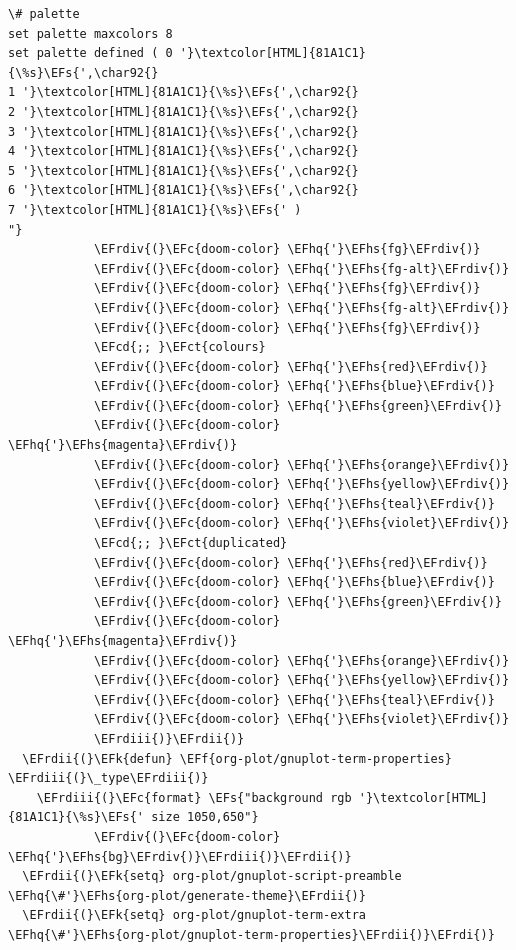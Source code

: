 \documentclass{scrartcl}
\newcommand{\EFk}[1]{\textcolor{EFk}{#1}} %
\newcommand{\EFs}[1]{\textcolor{EFs}{#1}} %
\newcommand{\EFct}[1]{\textcolor{EFct}{#1}} %
\newcommand{\EFc}[1]{\textcolor{EFc}{#1}} %
\newcommand{\EFf}[1]{\textcolor{EFf}{#1}} %
\newcommand{\EFcd}[1]{\textcolor{EFcd}{#1}} %
\newcommand{\EFhq}[1]{#1} %
\newcommand{\EFhs}[1]{#1} %
\newcommand{\EFrdi}[1]{#1} %
\newcommand{\EFrdii}[1]{#1} %
\newcommand{\EFrdiii}[1]{#1} %
\newcommand{\EFrdiv}[1]{#1} %
\begin{document}
\begin{Code}
\begin{Verbatim}[]
\# palette
set palette maxcolors 8
set palette defined ( 0 '}\textcolor[HTML]{81A1C1}{\%s}\EFs{',\char92{}
1 '}\textcolor[HTML]{81A1C1}{\%s}\EFs{',\char92{}
2 '}\textcolor[HTML]{81A1C1}{\%s}\EFs{',\char92{}
3 '}\textcolor[HTML]{81A1C1}{\%s}\EFs{',\char92{}
4 '}\textcolor[HTML]{81A1C1}{\%s}\EFs{',\char92{}
5 '}\textcolor[HTML]{81A1C1}{\%s}\EFs{',\char92{}
6 '}\textcolor[HTML]{81A1C1}{\%s}\EFs{',\char92{}
7 '}\textcolor[HTML]{81A1C1}{\%s}\EFs{' )
"}
            \EFrdiv{(}\EFc{doom-color} \EFhq{'}\EFhs{fg}\EFrdiv{)}
            \EFrdiv{(}\EFc{doom-color} \EFhq{'}\EFhs{fg-alt}\EFrdiv{)}
            \EFrdiv{(}\EFc{doom-color} \EFhq{'}\EFhs{fg}\EFrdiv{)}
            \EFrdiv{(}\EFc{doom-color} \EFhq{'}\EFhs{fg-alt}\EFrdiv{)}
            \EFrdiv{(}\EFc{doom-color} \EFhq{'}\EFhs{fg}\EFrdiv{)}
            \EFcd{;; }\EFct{colours}
            \EFrdiv{(}\EFc{doom-color} \EFhq{'}\EFhs{red}\EFrdiv{)}
            \EFrdiv{(}\EFc{doom-color} \EFhq{'}\EFhs{blue}\EFrdiv{)}
            \EFrdiv{(}\EFc{doom-color} \EFhq{'}\EFhs{green}\EFrdiv{)}
            \EFrdiv{(}\EFc{doom-color} \EFhq{'}\EFhs{magenta}\EFrdiv{)}
            \EFrdiv{(}\EFc{doom-color} \EFhq{'}\EFhs{orange}\EFrdiv{)}
            \EFrdiv{(}\EFc{doom-color} \EFhq{'}\EFhs{yellow}\EFrdiv{)}
            \EFrdiv{(}\EFc{doom-color} \EFhq{'}\EFhs{teal}\EFrdiv{)}
            \EFrdiv{(}\EFc{doom-color} \EFhq{'}\EFhs{violet}\EFrdiv{)}
            \EFcd{;; }\EFct{duplicated}
            \EFrdiv{(}\EFc{doom-color} \EFhq{'}\EFhs{red}\EFrdiv{)}
            \EFrdiv{(}\EFc{doom-color} \EFhq{'}\EFhs{blue}\EFrdiv{)}
            \EFrdiv{(}\EFc{doom-color} \EFhq{'}\EFhs{green}\EFrdiv{)}
            \EFrdiv{(}\EFc{doom-color} \EFhq{'}\EFhs{magenta}\EFrdiv{)}
            \EFrdiv{(}\EFc{doom-color} \EFhq{'}\EFhs{orange}\EFrdiv{)}
            \EFrdiv{(}\EFc{doom-color} \EFhq{'}\EFhs{yellow}\EFrdiv{)}
            \EFrdiv{(}\EFc{doom-color} \EFhq{'}\EFhs{teal}\EFrdiv{)}
            \EFrdiv{(}\EFc{doom-color} \EFhq{'}\EFhs{violet}\EFrdiv{)}
            \EFrdiii{)}\EFrdii{)}
  \EFrdii{(}\EFk{defun} \EFf{org-plot/gnuplot-term-properties} \EFrdiii{(}\_type\EFrdiii{)}
    \EFrdiii{(}\EFc{format} \EFs{"background rgb '}\textcolor[HTML]{81A1C1}{\%s}\EFs{' size 1050,650"}
            \EFrdiv{(}\EFc{doom-color} \EFhq{'}\EFhs{bg}\EFrdiv{)}\EFrdiii{)}\EFrdii{)}
  \EFrdii{(}\EFk{setq} org-plot/gnuplot-script-preamble \EFhq{\#'}\EFhs{org-plot/generate-theme}\EFrdii{)}
  \EFrdii{(}\EFk{setq} org-plot/gnuplot-term-extra \EFhq{\#'}\EFhs{org-plot/gnuplot-term-properties}\EFrdii{)}\EFrdi{)}
\end{Verbatim}
\end{Code}
\end{document}
